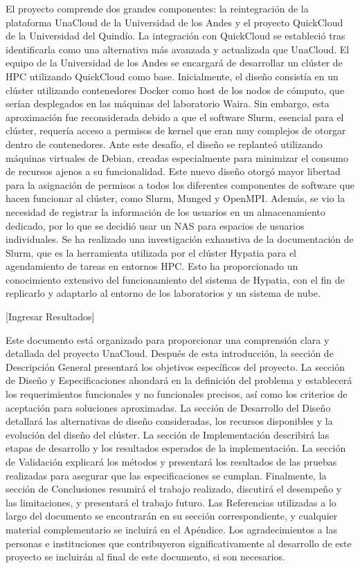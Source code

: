 El proyecto comprende dos grandes componentes: la reintegración de la plataforma UnaCloud de la Universidad de los Andes y el proyecto QuickCloud de la Universidad del Quindío. La integración con QuickCloud se estableció tras identificarla como una alternativa más avanzada y actualizada que UnaCloud. El equipo de la Universidad de los Andes se encargará de desarrollar un clúster de HPC utilizando QuickCloud como base. Inicialmente, el diseño consistía en un clúster utilizando contenedores Docker como host de los nodos de cómputo, que serían desplegados en las máquinas del laboratorio Waira. Sin embargo, esta aproximación fue reconsiderada debido a que el software Slurm, esencial para el clúster, requería acceso a permisos de kernel que eran muy complejos de otorgar dentro de contenedores. Ante este desafío, el diseño se replanteó utilizando máquinas virtuales de Debian, creadas especialmente para minimizar el consumo de recursos ajenos a su funcionalidad. Este nuevo diseño otorgó mayor libertad para la asignación de permisos a todos los diferentes componentes de software que hacen funcionar al clúster, como Slurm, Munged y OpenMPI. Además, se vio la necesidad de registrar la información de los usuarios en un almacenamiento dedicado, por lo que se decidió usar un NAS para espacios de usuarios individuales. Se ha realizado una investigación exhaustiva de la documentación de Slurm, que es la herramienta utilizada por el clúster Hypatia para el agendamiento de tareas en entornos HPC. Esto ha proporcionado un conocimiento extensivo del funcionamiento del sistema de Hypatia, con el fin de replicarlo y adaptarlo al entorno de los laboratorios y un sistema de nube.

[Ingresar Resultados]

Este documento está organizado para proporcionar una comprensión clara y detallada del proyecto UnaCloud. Después de esta introducción, la sección de Descripción General presentará los objetivos específicos del proyecto. La sección de Diseño y Especificaciones ahondará en la definición del problema y establecerá los requerimientos funcionales y no funcionales precisos, así como los criterios de aceptación para soluciones aproximadas. La sección de Desarrollo del Diseño detallará las alternativas de diseño consideradas, los recursos disponibles y la evolución del diseño del clúster. La sección de Implementación describirá las etapas de desarrollo y los resultados esperados de la implementación. La sección de Validación explicará los métodos y presentará los resultados de las pruebas realizadas para asegurar que las especificaciones se cumplan. Finalmente, la sección de Conclusiones resumirá el trabajo realizado, discutirá el desempeño y las limitaciones, y presentará el trabajo futuro. Las Referencias utilizadas a lo largo del documento se encontrarán en su sección correspondiente, y cualquier material complementario se incluirá en el Apéndice. Los agradecimientos a las personas e instituciones que contribuyeron significativamente al desarrollo de este proyecto se incluirán al final de este documento, si son necesarios.